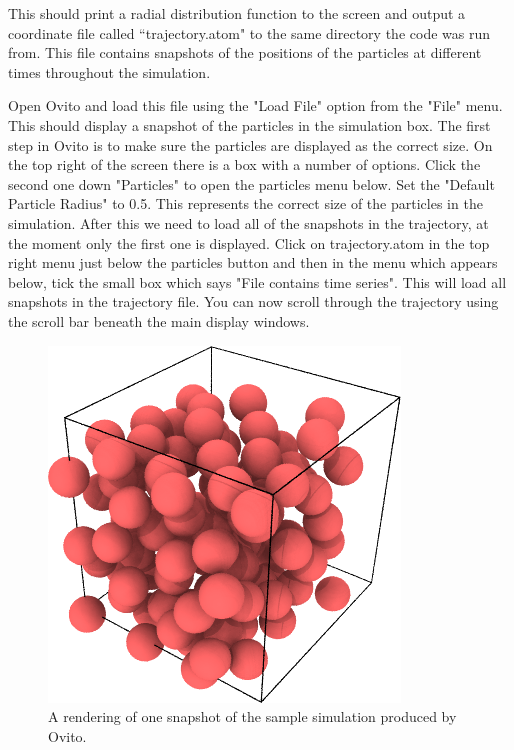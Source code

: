 This should print a radial distribution function to the screen and output a coordinate file called ``trajectory.atom" to the same directory the code was run from. This file contains snapshots of the positions of the particles at different times throughout the simulation. 

Open Ovito and load this file using the "Load File" option from the "File" menu. This should display a snapshot of the particles in the simulation box. The first step in Ovito is to make sure the particles are displayed as the correct size. On the top right of the screen there is a box with a number of options. Click the second one down "Particles" to open the particles menu below. Set the "Default Particle Radius" to 0.5. This represents the correct size of the particles in the simulation. After this we need to load all of the snapshots in the trajectory, at the moment only the first one is displayed. Click on trajectory.atom in the top right menu just below the particles button and then in the menu which appears below, tick the small box which says "File contains time series". This will load all snapshots in the trajectory file. You can now scroll through the trajectory using the scroll bar beneath the main display windows. 

	\begin{figure}[h]
		\centering
		\includegraphics[scale=0.6]{images/example_render}
		\caption{A rendering of one snapshot of the sample simulation produced by Ovito.}
		\label{fig:picircle}
	\end{figure}